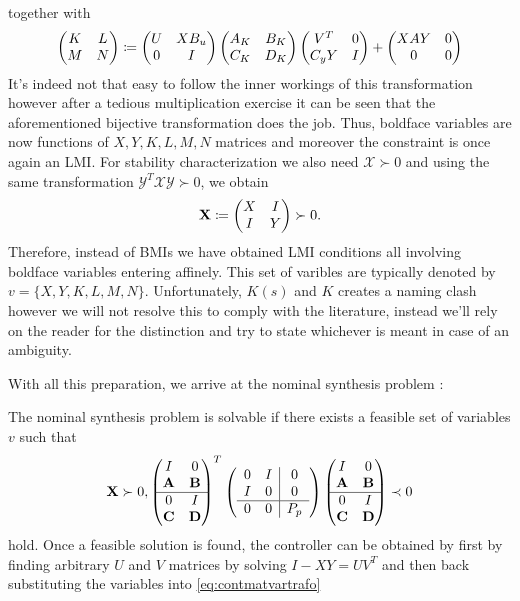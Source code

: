 together with
\begin{equation}
\begin{pmatrix}K&L\\M&N\end{pmatrix}\coloneqq \begin{pmatrix}U&XB_u\\0&I\end{pmatrix}\begin{pmatrix}A_K  & B_K \\C_K  & D_K\end{pmatrix}
\begin{pmatrix}V^T&0\\C_yY&I\end{pmatrix}+\begin{pmatrix}XAY&0\\0&0\end{pmatrix}
\label{eq:contmatvartrafo}
\end{equation}
It's indeed not that easy to follow the inner workings of this transformation however after a tedious multiplication exercise
it can be seen that the aforementioned bijective transformation does the job. Thus, boldface variables are now functions of 
$X,Y,K,L,M,N$ matrices and moreover the constraint is once again an LMI. For stability characterization we also need 
$\mathcal{X}\succ 0$ and using the same transformation $\mathcal{Y}^T\mathcal{X}\mathcal{Y}\succ 0$, we obtain
\[
\mathbf{X} \coloneqq \begin{pmatrix}X&I\\I&Y\end{pmatrix}\succ 0.
\]
Therefore, instead of BMIs we have obtained LMI conditions all involving boldface variables entering affinely. This set of varibles 
are typically denoted by $v=\{X,Y,K,L,M,N\}$. Unfortunately, $K(s)$ and $K$ creates a naming clash however we will not resolve this 
to comply with the literature, instead we'll rely on the reader for the distinction and try to state whichever is meant in case of an
ambiguity. 

With all this preparation, we arrive at the nominal synthesis problem : 
\begin{thm}\label{thm:nomsynthLMI} The nominal synthesis problem is solvable if there exists a feasible set of 
variables $v$ such that
\begin{equation}
\mathbf{X}\succ 0,\begin{pmatrix}I&0\\\mathbf{A}&\mathbf{B}\\\hline 0&I\\\mathbf{C}&\mathbf{D}\end{pmatrix}^T
\left(
\begin{array}{cc|c}
	0&I&0\\I&0&0\\\hline 0&0&P_p
\end{array}
\right)
\begin{pmatrix}I&0\\\mathbf{A}&\mathbf{B}\\\hline 0&I\\\mathbf{C}&\mathbf{D}\end{pmatrix} \prec 0
\label{eq:nomsynthLMI}
\end{equation}
hold. Once a feasible solution is found, the controller can be obtained by first by finding arbitrary $U$ and $V$ matrices by 
solving $I-XY= UV^T$ and then back substituting the variables into \eqref{eq:contmatvartrafo}
\end{thm}

